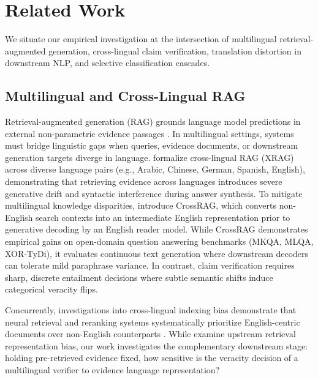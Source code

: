 \section{Related Work}
\label{sec:related_work}

We situate our empirical investigation at the intersection of multilingual retrieval-augmented generation, cross-lingual claim verification, translation distortion in downstream NLP, and selective classification cascades.

\subsection{Multilingual and Cross-Lingual RAG}
Retrieval-augmented generation (RAG) grounds language model predictions in external non-parametric evidence passages \citep{lewis-etal-2020-rag}. In multilingual settings, systems must bridge linguistic gaps when queries, evidence documents, or downstream generation targets diverge in language. \citet{liu-etal-2025-xrag} formalize cross-lingual RAG (XRAG) across diverse language pairs (e.g., Arabic, Chinese, German, Spanish, English), demonstrating that retrieving evidence across languages introduces severe generative drift and syntactic interference during answer synthesis. To mitigate multilingual knowledge disparities, \citet{ranaldi-etal-2026-multilingual} introduce CrossRAG, which converts non-English search contexts into an intermediate English representation prior to generative decoding by an English reader model. While CrossRAG demonstrates empirical gains on open-domain question answering benchmarks (MKQA, MLQA, XOR-TyDi), it evaluates continuous text generation where downstream decoders can tolerate mild paraphrase variance. In contrast, claim verification requires sharp, discrete entailment decisions where subtle semantic shifts induce categorical veracity flips.

Concurrently, investigations into cross-lingual indexing bias demonstrate that neural retrieval and reranking systems systematically prioritize English-centric documents over non-English counterparts \citep{wang-etal-2026-languages,conneau-etal-2020-unsupervised}. While \citet{wang-etal-2026-languages} examine upstream retrieval representation bias, our work investigates the complementary downstream stage: holding pre-retrieved evidence fixed, how sensitive is the veracity decision of a multilingual verifier to evidence language representation?

